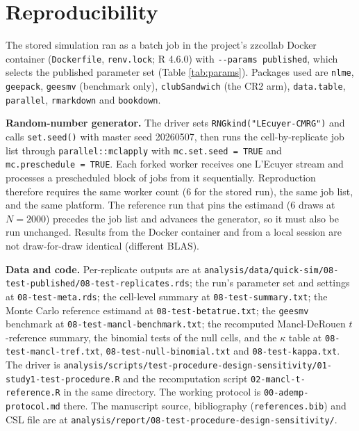 \documentclass[
  11pt,
]{article}
\begin{document}
\section{Reproducibility}\label{reproducibility}

The stored simulation ran as a batch job in the project's zzcollab
Docker container (\texttt{Dockerfile}, \texttt{renv.lock}; R 4.6.0) with
\texttt{-\/-params\ published}, which selects the published parameter set
(Table \ref{tab:params}). Packages used are \texttt{nlme}, \texttt{geepack},
\texttt{geesmv} (benchmark only), \texttt{clubSandwich} (the CR2 arm),
\texttt{data.table}, \texttt{parallel}, \texttt{rmarkdown} and \texttt{bookdown}.

\textbf{Random-number generator.} The driver sets
\texttt{RNGkind("L\textquotesingle{}Ecuyer-CMRG")} and calls \texttt{set.seed()} with master seed
20260507, then runs the
cell-by-replicate job list through \texttt{parallel::mclapply} with
\texttt{mc.set.seed\ =\ TRUE} and \texttt{mc.preschedule\ =\ TRUE}. Each forked worker
receives one L'Ecuyer stream and processes a prescheduled block of
jobs from it sequentially. Reproduction therefore requires the same
worker count (6 for the stored run), the same job
list, and the same platform. The reference run that pins the
estimand (6 draws at \(N = 2000\)) precedes the
job list and advances the generator, so it must also be run
unchanged. Results from the Docker container and from a local
session are not draw-for-draw identical (different BLAS).

\textbf{Data and code.} Per-replicate outputs are at
\texttt{analysis/data/quick-sim/08-test-published/08-test-replicates.rds};
the run's parameter set and settings at \texttt{08-test-meta.rds}; the
cell-level
summary at \texttt{08-test-summary.txt}; the Monte Carlo reference estimand
at \texttt{08-test-betatrue.txt}; the \texttt{geesmv} benchmark at
\texttt{08-test-mancl-benchmark.txt}; the recomputed Mancl-DeRouen
\(t\)-reference summary, the binomial tests of the null cells, and the
\(\kappa\) table at \texttt{08-test-mancl-tref.txt},
\texttt{08-test-null-binomial.txt} and \texttt{08-test-kappa.txt}. The driver
is
\texttt{analysis/scripts/test-procedure-design-sensitivity/01-study1-test-procedure.R}
and the recomputation script \texttt{02-mancl-t-reference.R} in the same
directory. The working protocol is \texttt{00-ademp-protocol.md} there. The
manuscript source, bibliography (\texttt{references.bib}) and CSL file are
at \texttt{analysis/report/08-test-procedure-design-sensitivity/}.
\end{document}
